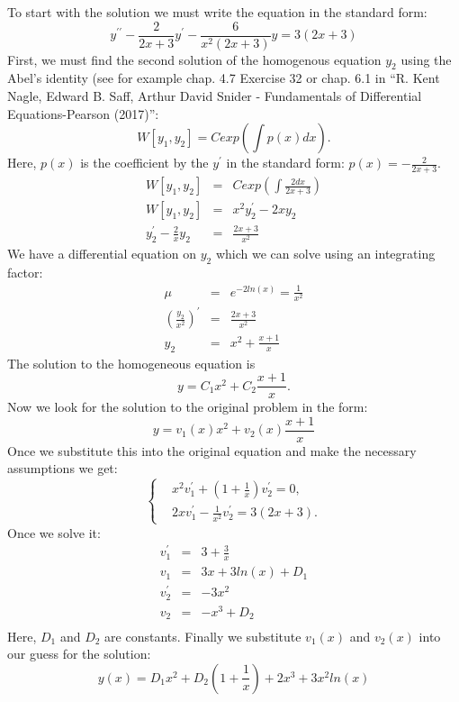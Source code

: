 \documentclass[11pt]{article}
\begin{document}
\begin{solution}
  To start with the solution we must write the equation in the standard form:
  \[ y^{\prime \prime} - \frac {2} {2x + 3} y^{\prime} - \frac {6} {x^2 (2x + 3)} y =
    3 \left( 2x + 3 \right) \]
  First, we must find the second solution of the homogenous equation $y_2$ using the Abel's
  identity (see for example chap. 4.7 Exercise 32 or chap. 6.1 in ``R. Kent Nagle, Edward B. Saff, Arthur David Snider - Fundamentals of Differential Equations-Pearson (2017)'':
  \[ W[y_1, y_2] = C exp \left( \int p(x) dx \right).\]
  Here, $p(x)$ is the coefficient by the $y^{\prime}$ in the standard form:
  $p(x) = - \frac {2} {2x + 3} $.
  \begin{eqnarray*}
    W[y_1, y_2] & = & C exp \left( \int \frac {2 dx} {2x + 3} \right) \\
    W[y_1, y_2] & = & x^2 y_2^{\prime} - 2 x y_2 \\
    y_2^{\prime} - \frac {2} {x} y_2 & = & \frac {2x + 3} {x^2}
  \end{eqnarray*}
  We have a differential equation on $y_2$ which we can solve using an integrating factor:
  \begin{eqnarray*}
    \mu & = & e ^{-2ln(x)} = \frac {1} {x^2} \\
    \left( \frac {y_2} {x^2} \right)^{\prime} & = & \frac {2x + 3} {x^2} \\
    y_2 & = & x^2 + \frac {x + 1} {x}
  \end{eqnarray*}
  The solution to the homogeneous equation is
  \[y = C_1 x^2 + C_2 \frac {x+1} {x}. \]
  Now we look for the solution to the original problem in the form:
  \[ y = v_1(x) x^2 + v_2(x) \frac {x+1} {x} \]
  Once we substitute this into the original equation and make the necessary assumptions
  we get:
  \begin{equation}
    \left \{
    \begin{aligned}
      & x^2 v_1^{\prime} + \left( 1 + \frac {1} {x} \right) v_2^{\prime} = 0, \\
      & 2x v_1^{\prime} - \frac {1} {x^2} v_2^{\prime} = 3 \left( 2x + 3 \right).
    \end{aligned}
    \right.
  \end{equation}
  Once we solve it:
  \begin{eqnarray*}
    v_1^{\prime} & = & 3 + \frac {3} {x} \\
    v_1 & = & 3x + 3ln(x) + D_1 \\
    v_2^{\prime} & = & -3x^2 \\
    v_2 & = & -x^3 + D_2 \\
  \end{eqnarray*}
  Here, $D_1$ and $D_2$ are constants. Finally we substitute $v_1(x)$ and $v_2(x)$
  into our guess for the solution:
  \begin{equation*}
    \boxed{y(x) = D_1 x^2 + D_2 \left( 1 + \frac {1} {x} \right) + 2x^3 + 3x^2 ln(x)  } 
  \end{equation*}
\end{solution}
\end{document}
